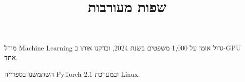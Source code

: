 \documentclass[11pt,a4paper]{article}
\title{שפות מעורבות}
\date{}
\begin{document}
\maketitle

מודל \foreignlanguage{english}{Machine Learning} גדול אומן על 1,000 משפטים בשנת 2024, ובדקנו אותו ב-\foreignlanguage{english}{GPU} אחד.

השתמשנו בספרייה \foreignlanguage{english}{PyTorch 2.1} ובמערכת \foreignlanguage{english}{Linux}.
\end{document}
